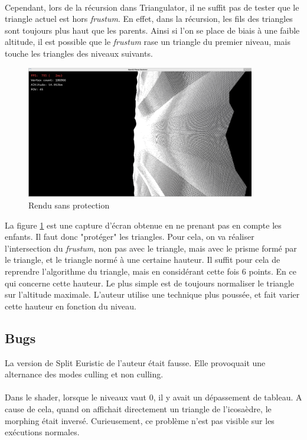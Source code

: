   \paragraph{}
  Cependant, lors de la récursion dans Triangulator, il ne suffit pas de tester que le triangle actuel est hors \emph{frustum}. En effet, dans la récursion, les fils des triangles sont toujours plus haut que les parents. Ainsi si l'on se place de biais à une faible altitude, il est possible que le \emph{frustum} rase un triangle du premier niveau, mais touche les triangles des niveaux suivants. 
  \begin{figure}[H]
  \centerline{
  \includegraphics[width=10cm]{img/noCullingProtection.png}}
  \caption{Rendu sans protection}
  \label{fig:noProtectionCulling}
  \end{figure}
  La figure \ref{fig:noProtectionCulling} est une capture d'écran obtenue en ne prenant pas en compte les enfants. Il faut donc "protéger" les triangles. Pour cela, on va réaliser l'intersection du \emph{frustum}, non pas avec le triangle, mais avec le prisme formé par le triangle, et le triangle normé à une certaine hauteur. Il suffit pour cela de reprendre l'algorithme du triangle, mais en considérant cette fois 6 points.
  En ce qui concerne cette hauteur. Le plus simple est de toujours normaliser le triangle sur l'altitude maximale. L'auteur utilise une technique plus poussée, et fait varier cette hauteur en fonction du niveau.  
  
  \subsection{Bugs}
  \label{sec:culling_bug}
  La version de Split Euristic de l'auteur était fausse. Elle provoquait une alternance des modes culling et non culling.\\\\
  
  Dans le shader, lorsque le niveaux vaut 0, il y avait un dépassement de tableau. A cause de cela, quand on affichait directement un triangle de l'icosaèdre, le morphing était inversé. Curieusement, ce problème n'est pas visible sur les exécutions normales.

